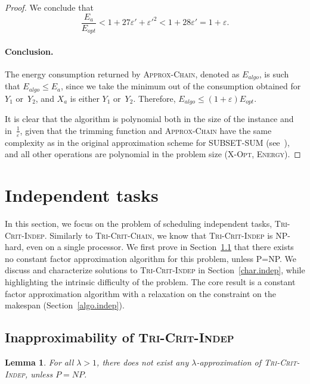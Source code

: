 \documentclass[a4paper]{article}
\theoremstyle{plain}
\newtheorem{lemma}{Lemma}
\theoremstyle{definition}
\theoremstyle{remark}
\newcommand{\energy}{\textsc{Energy}} \newcommand{\exe}{\ensuremath{\mathcal{E}\!xe}\xspace}
\newcommand{\approxchain}{\textsc{Ap\-prox-Chain}}
\newcommand{\xopt}{\textsc{X-Opt}}
\newcommand{\chain}{\textsc{Tri-Crit-Chain}\xspace}
\newcommand{\indep}{\textsc{Tri-Crit-In\-dep}\xspace}
\begin{document}
\begin{proof}
\medskip
We conclude that 
\begin{equation*}
\frac{E_{a}}{E_{opt}}< 1 + 27 \varepsilon' + \varepsilon'^2 < 1+28\varepsilon' = 1+\varepsilon.
\end{equation*}


\paragraph{Conclusion. }
The energy consumption returned by \approxchain\xspace, denoted as
$E_{algo}$, is such that $E_{algo} \leq E_a$, since we take the minimum
out of the consumption obtained for $Y_1$ or~$Y_2$, and $X_a$ is
either $Y_1$ or~$Y_2$. Therefore, $E_{algo}\leq
(1+\varepsilon)E_{opt}$. 

It is clear that the algorithm is polynomial both in the size of the
instance and in~$\frac{1}{\varepsilon}$, given that the trimming
function and \approxchain\xspace have the same complexity as in the
original approximation scheme for SUB\-SET-SUM (see~\cite{cormen}), and
all other operations are polynomial in the problem size (\xopt,
\energy). 
\end{proof}


\section{Independent tasks}
\label{sec.indep}
    
In this section, we focus on the problem of scheduling independent
tasks, \indep. Similarly to \chain, we know that \indep is NP-hard,
even on a single processor. We first prove in
Section~\ref{sec.inapprox} that there exists no constant factor
approximation algorithm for this problem, unless P=NP. We discuss and
characterize solutions to \indep in Section~\ref{char.indep}, while
highlighting the intrinsic difficulty of the problem. The core result
is a constant factor approximation algorithm with a relaxation on the
constraint on the makespan (Section~\ref{algo.indep}).





\subsection{Inapproximability of \indep}
\label{sec.inapprox}

\begin{lemma}
    \label{indep.inapprox}
For all $\lambda >1$, there does not exist any $\lambda$-approxi\-mation
of \indep, unless $P=NP$. 
\end{lemma}
\end{document}
